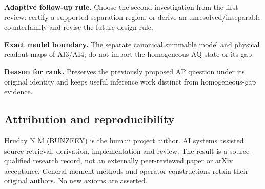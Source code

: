 \textbf{Adaptive follow-up rule.} Choose the second investigation from the first review: certify a supported separation region, or derive an unresolved/inseparable counterfamily and revise the future design rule.

\textbf{Exact model boundary.} The separate canonical summable model and physical readout maps of AI3/AI4; do not import the homogeneous AQ state or its gap.

\textbf{Reason for rank.} Preserves the previously proposed AP question under its original identity and keeps useful inference work distinct from homogeneous-gap evidence.

\subsection*{Attribution and reproducibility}

Hruday N M (BUNZEEY) is the human project author. AI systems assisted source retrieval, derivation, implementation and review. The result is a source-qualified research record, not an externally peer-reviewed paper or arXiv acceptance. General moment methods and operator constructions retain their original authors. No new axioms are asserted.


\par{}
